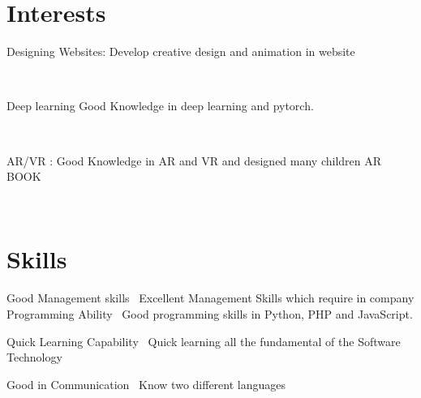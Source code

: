 \documentclass[]{cv-style}          %
\begin{document}

\section{Interests}
  \vspace{-0.3cm}
\begin{entrylist}
\entry
{}
{ Designing Websites:}
{}
{Develop creative design and animation in website}

\end{entrylist}\
\begin{entrylist}
\entry
{}
{ Deep learning}
{}
{Good Knowledge in deep learning and pytorch.  }
\end{entrylist}\
\begin{entrylist}
\entry
{}
{AR/VR :}
{}
{Good Knowledge in AR and VR and designed many children AR BOOK
}

\end{entrylist}\

\section{Skills}
  \vspace{-0.2cm}

\begin{entrylist}
\entry
  {}
  {Good Management skills}
  {}
  {\jobtitle{}\  Excellent Management Skills which require in company}
\entry
  {}
  {Programming Ability }
  {}
  {\jobtitle{}\  Good programming skills in Python, PHP and JavaScript.}
  
  \entry
  {}
  { Quick Learning Capability}
  {}
  {\jobtitle{}\ Quick learning all the fundamental of the Software Technology    }
  
  \entry
  {}
  {Good in Communication }
  {}
  {\jobtitle{}\  Know two different languages }
  

\end{entrylist}
\end{document}
